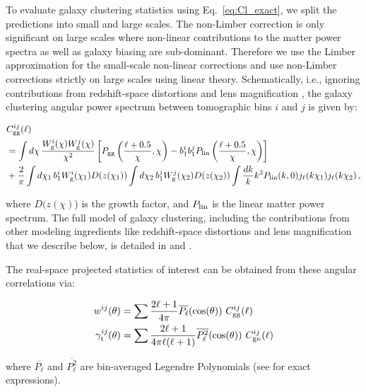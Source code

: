 \documentclass[aps, prd,twocolumn,superscriptaddress,nofootinbib,preprintnumbers]{revtex4-1}
\begin{document}
To evaluate galaxy clustering statistics using Eq.~\ref{eq:Cl_exact}, we split the predictions into small and large scales. The non-Limber correction is only significant on large scales where non-linear contributions to the matter power spectra as well as galaxy biasing are sub-dominant. Therefore we use the Limber approximation for the small-scale non-linear corrections and use non-Limber corrections strictly on large scales using linear theory. Schematically, i.e., ignoring contributions from redshift-space distortions and lens magnification \cite[see][for details]{y3-generalmethods}, the galaxy clustering angular power spectrum between tomographic bins $i$ and $j$ is given by:
\begin{widetext}
\begin{align}
    &C_{\rm gg}^{ij} (\ell) \nonumber\\
    &= \int d\chi\, \frac{W_{\rm g}^i(\chi)W_{\rm g}^j(\chi)}{\chi^2} \left[P_{\rm gg}\left(\frac{\ell+0.5}{\chi},\chi\right)- b_1^{i} b_1^{j} P_{\rm lin}\left(\frac{\ell+0.5}{\chi},\chi\right)\right]\nonumber\\
    &+\frac{2}{\pi}\int d\chi_1\,b_{1}^i W_{\rm g}^i(\chi_1) D(z(\chi_1))\int d\chi_2\,b_{1}^j W_{\rm g}^j(\chi_2)D(z(\chi_2)) \int\frac{dk}{k}k^3 P_{\rm lin}(k,0)j_\ell(k\chi_1)j_\ell(k\chi_2)\,,
\label{eq:Cl-DD_rewrite}
\end{align}
\end{widetext}
where $D(z(\chi)$) is the growth factor, and $P_{\rm lin}$ is the linear matter power spectrum. The full model of galaxy clustering, including the contributions from other modeling ingredients like redshift-space distortions and lens magnification that we describe below, is detailed in \cite{Fang_nonlimber} and \cite{y3-generalmethods}. 

The real-space projected statistics of interest can be obtained from these angular correlations via:
\begin{linenomath*}
\begin{align}\label{eq:2pt_exact}
    w^{ij}(\theta) &= \sum \frac{2\ell + 1}{4\pi} \overline{P_{\ell}}(\cos(\theta)) \ C^{ij}_{\rm gg}(\ell) \\
    \gamma_{\rm t}^{ij}(\theta) &= \sum \frac{2\ell + 1}{4\pi \ell (\ell + 1)} \overline{P_{\ell}^2}(\cos(\theta)) \ C^{ij}_{\rm g\kappa}(\ell)
\end{align}
\end{linenomath*}
where $\overline{P_{\ell}}$ and $\overline{P_{\ell}^2}$ are bin-averaged Legendre Polynomials (see \citep{y3-covariances} for exact expressions). 
\end{document}
